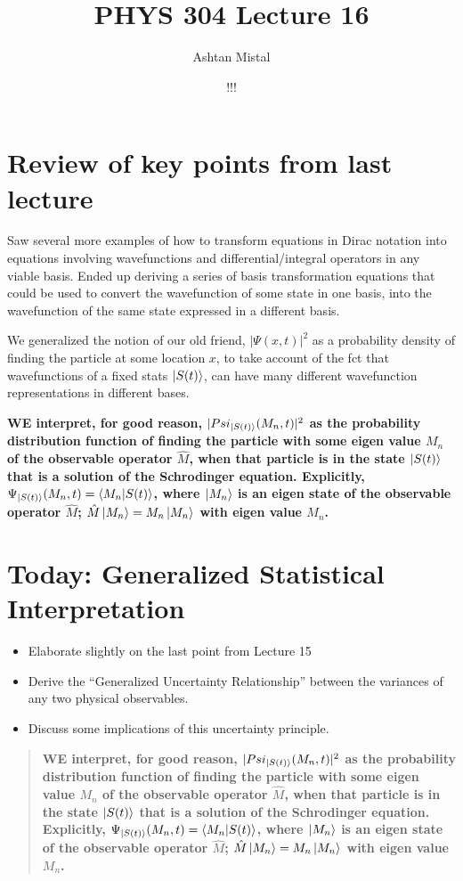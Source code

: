 \documentclass{article}
\title{PHYS 304 Lecture 16}
\author{Ashtan Mistal}
\date{!!!}
\begin{document}
\ifstandalone
\maketitle
\fi

\graphicspath{{./Lecture16/}}




\section{Review of key points from last lecture}

Saw several more examples of how to transform equations in Dirac notation into equations involving wavefunctions and differential/integral operators in any viable basis. Ended up deriving a series of basis transformation equations that could be used to convert the wavefunction of some state in one basis, into the wavefunction of the same state expressed in a different basis.

We generalized the notion of our old friend, $|\Psi(x,t)|^2$ as a probability density of finding the particle at some location $x$, to take account of the fct that wavefunctions of a fixed stats $\ket{S(t)}$, can have many different wavefunction representations in different bases. 

\textbf{WE interpret, for good reason, $|Psi_{\ket{S(t)}}(M_n,t)|^2$ as the probability distribution function of finding the particle with some eigen value $M_n$ of the observable operator $\hat{M}$, when that particle is in the state $\ket{S(t)}$ that is a solution of the Schrodinger equation. Explicitly, $\Psi_{\ket{S(t)}}(M_n,t) = \braket{M_n|S(t)}$, where $\ket{M_n}$ is an eigen state of the observable operator $\hat{M}$; $\hat{M} \ket{M_n} = M_n \ket{M_n}$ with eigen value $M_n$. }


\section{Today: Generalized Statistical Interpretation}

\begin{itemize}
    \item Elaborate slightly on the last point from Lecture 15
    \item Derive the “Generalized Uncertainty Relationship” between the variances of any two physical observables.
    \item Discuss some implications of this uncertainty principle.
\end{itemize}
\begin{quote}
    \textbf{WE interpret, for good reason, $|Psi_{\ket{S(t)}}(M_n,t)|^2$ as the probability distribution function of finding the particle with some eigen value $M_n$ of the observable operator $\hat{M}$, when that particle is in the state $\ket{S(t)}$ that is a solution of the Schrodinger equation. Explicitly, $\Psi_{\ket{S(t)}}(M_n,t) = \braket{M_n|S(t)}$, where $\ket{M_n}$ is an eigen state of the observable operator $\hat{M}$; $\hat{M} \ket{M_n} = M_n \ket{M_n}$ with eigen value $M_n$. }
\end{quote}
\end{document}
